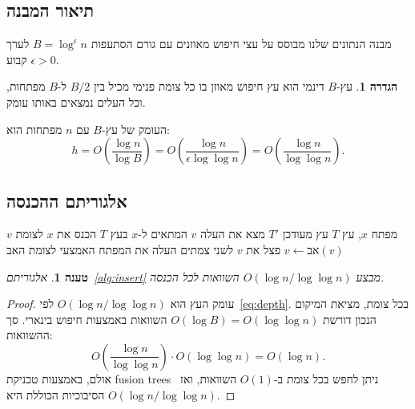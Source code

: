 \documentclass[12pt,a4paper]{article}
\theoremstyle{plain}
\newtheorem{proposition}[theorem]{טענה}
\theoremstyle{definition}
\newtheorem{definition}[theorem]{הגדרה}
\theoremstyle{remark}
\begin{document}
\subsection{תיאור המבנה}

מבנה הנתונים שלנו מבוסס על עצי חיפוש מאוזנים עם גורם
הסתעפות $B = \log^\epsilon n$ לערך קבוע $\epsilon > 0$.

\begin{definition}
\label{def:b_tree}
עץ-$B$ דינמי הוא עץ חיפוש מאוזן בו כל צומת פנימי מכיל
בין $B/2$ ל-$B$ מפתחות, וכל העלים נמצאים באותו עומק.
\end{definition}

העומק של עץ-$B$ עם $n$ מפתחות הוא:
\begin{equation}
\label{eq:depth}
h = O\!\left(\frac{\log n}{\log B}\right) = O\!\left(\frac{\log n}{\epsilon \log \log n}\right) = O\!\left(\frac{\log n}{\log \log n}\right).
\end{equation}

\subsection{אלגוריתם ההכנסה}

\begin{algorithm}[ht]
\caption{הכנסה לעץ-$B$ דינמי}
\label{alg:insert}
\begin{algorithmic}[1]
\Require מפתח $x$, עץ $T$
\Ensure עץ מעודכן $T'$
\State מצא את העלה $v$ המתאים ל-$x$ בעץ $T$
\State הכנס את $x$ לצומת $v$
  \State פצל את $v$ לשני צמתים
  \State העלה את המפתח האמצעי לצומת האב
  \State $v \gets \text{אב}(v)$
\EndWhile
\end{algorithmic}
\end{algorithm}

\begin{proposition}
\label{prop:insert_time}
אלגוריתם~\ref{alg:insert} מבצע $O(\log n / \log \log n)$
השוואות לכל הכנסה.
\end{proposition}

\begin{proof}
עומק העץ הוא $O(\log n / \log \log n)$ לפי~\eqref{eq:depth}.
בכל צומת, מציאת המיקום הנכון דורשת $O(\log B) = O(\log \log n)$
השוואות באמצעות חיפוש בינארי. סך ההשוואות:
\[
O\!\left(\frac{\log n}{\log \log n}\right) \cdot O(\log \log n) = O(\log n).
\]
אולם, באמצעות טכניקת fusion trees~\citep{fredman1993} ניתן
לחפש בכל צומת ב-$O(1)$ השוואות, ואז הסיבוכיות הכוללת היא
$O(\log n / \log \log n)$.
\end{proof}
\end{document}
